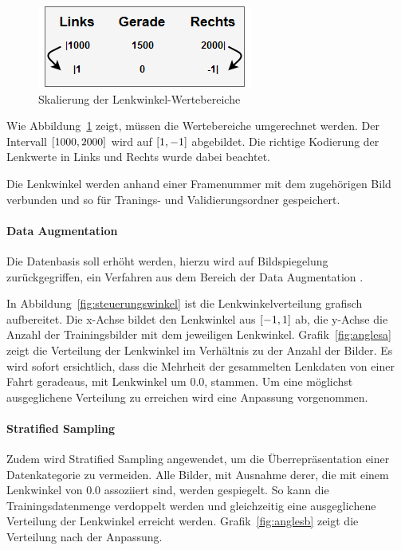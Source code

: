 \begin{figure}[h]
	\centering
	\includegraphics[scale=0.6]{figures/Lenkwinkelskalierung.png}
	\caption{Skalierung der Lenkwinkel-Wertebereiche}
	\label{img:skalierunglenkwinkel}
\end{figure}

Wie Abbildung~\ref{img:skalierunglenkwinkel} zeigt, müssen die Wertebereiche umgerechnet werden. Der Intervall $\interval{1000}{2000}$ wird auf $\interval{1}{-1}$ abgebildet. Die richtige Kodierung der Lenkwerte in Links und Rechts wurde dabei beachtet.

Die Lenkwinkel werden anhand einer Framenummer mit dem zugehörigen Bild verbunden und so für Tranings- und Validierungsordner gespeichert.

\paragraph{Data Augmentation}
Die Datenbasis soll erhöht werden, hierzu wird auf Bildspiegelung zurückgegriffen, ein Verfahren aus dem Bereich der Data Augmentation \cite{doi:10.1198/10618600152418584} \cite{perez2017effectiveness}.

In Abbildung~\ref{fig:steuerungswinkel} ist die Lenkwinkelverteilung grafisch aufbereitet. Die x-Achse bildet den Lenkwinkel aus $\interval{-1}{1}$ ab, die y-Achse die Anzahl der Trainingsbilder mit dem jeweiligen Lenkwinkel. Grafik~\ref{fig:anglesa} zeigt die Verteilung der Lenkwinkel im Verhältnis zu der Anzahl der Bilder. Es wird sofort ersichtlich, dass die Mehrheit der gesammelten Lenkdaten von einer Fahrt geradeaus, mit Lenkwinkel um 0.0, stammen. Um eine möglichst ausgeglichene Verteilung zu erreichen wird eine Anpassung vorgenommen.

\paragraph{Stratified Sampling}
Zudem wird Stratified Sampling \cite{liu2012stratified} angewendet, um die Überrepräsentation einer Datenkategorie zu vermeiden.
Alle Bilder, mit Ausnahme derer, die mit einem Lenkwinkel von 0.0 assoziiert sind, werden gespiegelt. So kann die Trainingsdatenmenge verdoppelt werden und gleichzeitig eine ausgeglichene Verteilung der Lenkwinkel erreicht werden. Grafik~\ref{fig:anglesb} zeigt die Verteilung nach der Anpassung.

